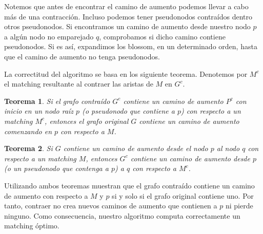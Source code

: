 \documentclass[twoside,12pt]{article}
\newtheorem{theorem}{Teorema}[section]
\begin{document}
Notemos que antes de encontrar el camino de aumento podemos llevar a cabo más de una contracción. Incluso podemos tener pseudonodos contraídos dentro otros pseudonodos. Si encontramos un camino de aumento desde nuestro nodo $p$ a algún nodo no emparejado $q$, comprobamos si dicho camino contiene pseudonodos. Si es así, expandimos los blossom, en un determinado orden, hasta que el camino de aumento no tenga pseudonodos. 

La correctitud del algoritmo se basa en los siguiente teorema. Denotemos por $M^c$ el matching resultante al contraer las aristas de $M$ en $G^c$.
\begin{theorem}
Si el grafo contraído $G^c$ contiene un camino de aumento $P^c$ con inicio en un nodo raíz $p$ (o pseudonodo que contiene a $p$) con respecto a un matching $M^c$, entonces el grafo original $G$ contiene un camino de aumento comenzando en $p$ con respecto a $M$.
\end{theorem}
\begin{theorem}
Si $G$ contiene un camino de aumento desde el nodo $p$  al nodo $q$ con respecto a un matching $M$, entonces $G^c$ contiene un camino de aumento desde $p$ (o un pseudonodo que contenga a $p$) a $q$ con respecto a $M^c$.
\end{theorem}
Utilizando ambos teoremas muestran que el grafo contraído contiene un camino de aumento con respecto a $M$ y $p$ si y solo si el grafo original contiene uno. Por tanto, contraer no crea nuevos caminos de aumento que contienen a $p$ ni pierde ninguno. Como consecuencia, nuestro algoritmo computa correctamente un matching óptimo.
\end{document}
